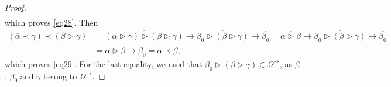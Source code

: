 \documentclass[10pt,a4paper]{amsart}
\numberwithin{equation}{section}
\begin{document}
\begin{proof}
\begin{align*}
\end{align*}
which proves \eqref{eq28}. Then
\begin{align*}
(\overline{\alpha}\prec \gamma)\prec (\beta \triangleright\gamma)&=\overline{(\alpha \triangleright \gamma)\triangleright (\beta \triangleright \gamma)}\rightarrow \overline{\beta_0\triangleright(\beta \triangleright \gamma)}\rightarrow \overline{\beta_0}=\overline{\alpha \triangleright \beta}\rightarrow \overline{\beta_0\triangleright(\beta \triangleright \gamma)}\rightarrow \overline{\beta_0}\\
&=\overline{\alpha \triangleright \beta}\rightarrow \overline{\beta_0}=\overline{\alpha}\prec \beta,
\end{align*}
which proves \eqref{eq29}. For the last equality, we used that $\beta_0\triangleright(\beta \triangleright \gamma)\in \Omega^\rightarrow$, as $\beta$, $\beta_0$ and $\gamma$ belong to $\Omega^\rightarrow$.


\end{proof}
\end{document}
